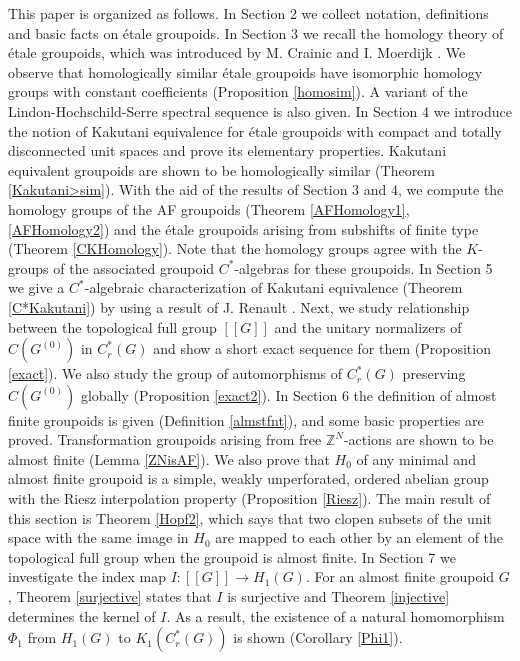 \documentclass[11pt]{article}
\theoremstyle{definition}
\newcommand{\Z}{\mathbb{Z}}
\begin{document}
This paper is organized as follows. 
In Section 2 
we collect notation, definitions and basic facts on \'etale groupoids. 
In Section 3 
we recall the homology theory of \'etale groupoids, 
which was introduced by M. Crainic and I. Moerdijk \cite{CM}. 
We observe that 
homologically similar \'etale groupoids have 
isomorphic homology groups with constant coefficients 
(Proposition \ref{homosim}). 
A variant of the Lindon-Hochschild-Serre spectral sequence is also given. 
In Section 4 
we introduce the notion of Kakutani equivalence 
for \'etale groupoids with compact and totally disconnected unit spaces 
and prove its elementary properties. 
Kakutani equivalent groupoids are shown to be homologically similar 
(Theorem \ref{Kakutani>sim}). 
With the aid of the results of Section 3 and 4, 
we compute the homology groups of the AF groupoids 
(Theorem \ref{AFHomology1}, \ref{AFHomology2}) and 
the \'etale groupoids arising from subshifts of finite type 
(Theorem \ref{CKHomology}). 
Note that the homology groups agree with 
the $K$-groups of the associated groupoid $C^*$-algebras 
for these groupoids. 
In Section 5 
we give a $C^*$-algebraic characterization of Kakutani equivalence 
(Theorem \ref{C*Kakutani}) 
by using a result of J. Renault \cite{R3}. 
Next, we study relationship 
between the topological full group $[[G]]$ and 
the unitary normalizers of $C(G^{(0)})$ in $C^*_r(G)$ 
and show a short exact sequence for them (Proposition \ref{exact}). 
We also study the group of automorphisms of $C^*_r(G)$ 
preserving $C(G^{(0)})$ globally (Proposition \ref{exact2}). 
In Section 6 
the definition of almost finite groupoids is given 
(Definition \ref{almstfnt}), 
and some basic properties are proved. 
Transformation groupoids arising from free $\Z^N$-actions are 
shown to be almost finite (Lemma \ref{ZNisAF}). 
We also prove that $H_0$ of any minimal and almost finite groupoid is 
a simple, weakly unperforated, ordered abelian group 
with the Riesz interpolation property (Proposition \ref{Riesz}). 
The main result of this section is Theorem \ref{Hopf2}, 
which says that 
two clopen subsets of the unit space with the same image in $H_0$ 
are mapped to each other by an element of the topological full group 
when the groupoid is almost finite. 
In Section 7 
we investigate the index map $I:[[G]]\to H_1(G)$. 
For an almost finite groupoid $G$, 
Theorem \ref{surjective} states that $I$ is surjective and 
Theorem \ref{injective} determines the kernel of $I$. 
As a result, 
the existence of a natural homomorphism $\Phi_1$ 
from $H_1(G)$ to $K_1(C^*_r(G))$ is shown (Corollary \ref{Phi1}). 
\end{document}
